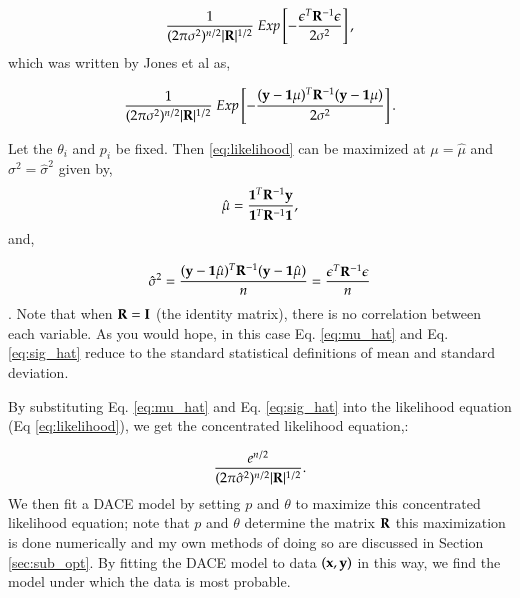 \begin{equation} \label{eq:likelihood1}
\frac{1}
  {(2\pi\sigma^2)^{n/2}|\mb{R}|^{1/2}}\ 
Exp \left 
  [ -\frac
    {\epsilon^T\mb{R}^{-1}\epsilon}
    {2\sigma^2} 
\right ],
\end{equation}
which was written by Jones et al as,

\begin{equation} \label{eq:likelihood}
\frac{1}
  {(2\pi\sigma^2)^{n/2}|\mb{R}|^{1/2}}\ 
Exp \left 
  [ -\frac
    {(\mb{y}-\mb{1}\mu)^T\mb{R}^{-1}(\mb{y}-\mb{1}\mu)}
    {2\sigma^2} 
\right ].
\end{equation}

Let the $\theta_i$ and $p_i$ be fixed. Then \ref{eq:likelihood} can be maximized at $\mu = \hat{\mu}$ and $\sigma^2 = \hat{\sigma}^2$ given by,
\begin{equation} \label{eq:mu_hat}
\hat{\mu}=\frac
	{\mathbf{1}^T\mathbf{R}^{-1}\mathbf{y}}
	{\mathbf{1}^T\mathbf{R}^{-1}\mathbf{1}},
\end{equation}
and,

\begin{equation} \label{eq:sig_hat}
\hat{\sigma}^2
    = \frac{(\mathbf{y}-\mathbf{1}\hat{\mu})^T\mathbf{R}^{-1}(\mathbf{y}-\mathbf{1}\hat{\mu})}{n} 
	= \frac{\epsilon^T\mathbf{R}^{-1}\epsilon}{n}
\end{equation}
\citep{jones_efficient_1998}. Note that when $\mathbf{R}=\mathbf{I}$ (the identity matrix), there is no correlation between each variable. As you would hope, in this case Eq. \ref{eq:mu_hat} and Eq. \ref{eq:sig_hat} reduce to the standard statistical definitions of mean and standard deviation.

By substituting Eq. \ref{eq:mu_hat} and Eq. \ref{eq:sig_hat} into the likelihood equation (Eq \ref{eq:likelihood}), we get the concentrated likelihood equation,:

\begin{equation} \label{eq:conc_likelihood}
\frac{e^{n/2}}
  {(2\pi\hat{\sigma}^2)^{n/2}|\mathbf{R}|^{1/2}}.
\end{equation}
We then fit a DACE model by setting $p$ and $\theta$ to maximize this concentrated likelihood equation; note that $p$ and $\theta$ determine the matrix $\mathbf{R}$ this maximization is done numerically and my own methods of doing so are discussed in Section \ref{sec:sub_opt}. By fitting the DACE model to data $(\mathbf{x},\mathbf{y})$ in this way, we find the model under which the data is most probable.

